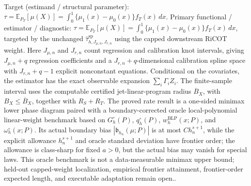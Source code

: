 \documentclass{article}
\begin{document}
Target (estimand / structural parameter): \(\tau=\mathbb E_{P_T}[\mu(X)]=\int_0^1\{\mu_1(x)-\mu_0(x)\}f_T(x)\,dx\).
Primary functional / estimator / diagnostic: \(\tau=\mathbb E_{P_T}[\mu(X)]=\int_0^1\{\mu_1(x)-\mu_0(x)\}f_T(x)\,dx\), targeted by the unchanged \(\widehat\tau^{\mathrm{sp}}_{h,J_{\mu,n},J_{r,n}}\) using the capped downstream RiCOT weight. Here \(J_{\mu,n}\) and \(J_{r,n}\) count regression and calibration knot intervals, giving \(J_{\mu,n}+q\) regression coefficients and a \(J_{r,n}+q\)-dimensional calibration spline space with \(J_{r,n}+q-1\) explicit nonconstant equations. Conditional on the covariates, the estimator has the exact observable expansion \(\sum_i\Gamma_i Z_i\). The finite-sample interval uses the computable certified jet-linear-program radius \(\overline B_X\), with \(B_X\le\overline B_X\), together with \(R_S+R_T\). The proved rate result is a one-sided minimax lower phase diagram paired with a boundary-corrected oracle local-polynomial linear-weight benchmark based on \(G_h^{\circ}(P)\), \(q_h^{\circ}(P)\), \(w_h^{\mathrm{BLP}}(x;P)\), and \(\omega_h^{\circ}(x;P)\). Its actual boundary bias \(|\mathfrak b_{h_n}(\mu;P)|\) is at most \(C h_n^{s+1}\), while the explicit allowance \(h_n^{s+1}\) and oracle standard deviation have frontier order; the allowance is class-sharp for fixed \(a>0\), but the actual bias may vanish for special laws. This oracle benchmark is not a data-measurable minimax upper bound; held-out capped-weight localization, empirical frontier attainment, frontier-order expected length, and executable adaptation remain open..
\end{document}
